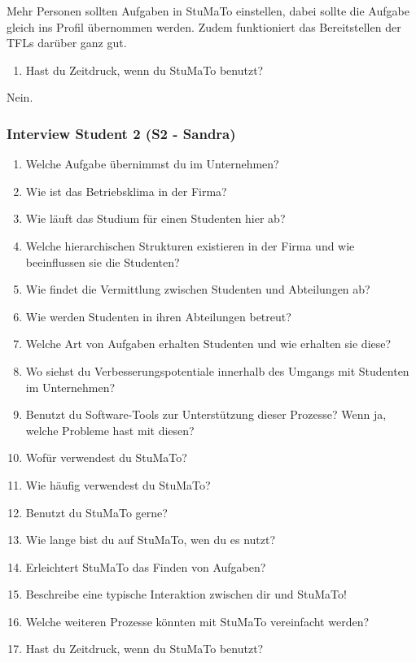 \documentclass[
  12pt,
  ngerman,
  a4paper,
]{article}
\providecommand{\tightlist}{%
  \setlength{\itemsep}{0pt}\setlength{\parskip}{0pt}}
\begin{document}
Mehr Personen sollten Aufgaben in StuMaTo einstellen, dabei sollte die
Aufgabe gleich ins Profil übernommen werden. Zudem funktioniert das
Bereitstellen der TFLs darüber ganz gut.

\begin{enumerate}
\def\labelenumi{\arabic{enumi}.}
\setcounter{enumi}{17}
\tightlist
\item
  Hast du Zeitdruck, wenn du StuMaTo benutzt?
\end{enumerate}

Nein.

\hypertarget{interview-student-2-s2---sandra}{%
\subsubsection{Interview Student 2 (S2 -
Sandra)}\label{interview-student-2-s2---sandra}}

\begin{enumerate}
\def\labelenumi{\arabic{enumi}.}
\tightlist
\item
  Welche Aufgabe übernimmst du im Unternehmen?
\item
  Wie ist das Betriebsklima in der Firma?
\item
  Wie läuft das Studium für einen Studenten hier ab?
\item
  Welche hierarchischen Strukturen existieren in der Firma und wie
  beeinflussen sie die Studenten?
\item
  Wie findet die Vermittlung zwischen Studenten und Abteilungen ab?
\item
  Wie werden Studenten in ihren Abteilungen betreut?
\item
  Welche Art von Aufgaben erhalten Studenten und wie erhalten sie diese?
\item
  Wo siehst du Verbesserungspotentiale innerhalb des Umgangs mit
  Studenten im Unternehmen?
\item
  Benutzt du Software-Tools zur Unterstützung dieser Prozesse? Wenn ja,
  welche Probleme hast mit diesen?
\item
  Wofür verwendest du StuMaTo?
\item
  Wie häufig verwendest du StuMaTo?
\item
  Benutzt du StuMaTo gerne?
\item
  Wie lange bist du auf StuMaTo, wen du es nutzt?
\item
  Erleichtert StuMaTo das Finden von Aufgaben?
\item
  Beschreibe eine typische Interaktion zwischen dir und StuMaTo!
\item
  Welche weiteren Prozesse könnten mit StuMaTo vereinfacht werden?
\item
  Hast du Zeitdruck, wenn du StuMaTo benutzt?
\end{enumerate}
\end{document}
